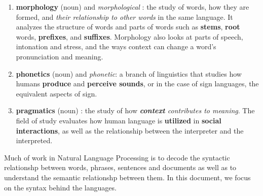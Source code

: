 \documentclass[11pt]{article}
\begin{document}
\begin{enumerate}
\item \textbf{morphology} (noun) and \emph{morphological} : the study of words, how they are formed, and \emph{their relationship to other words} in the same language. It analyzes the structure of words and parts of words such as \textbf{stems}, \textbf{root} words, \textbf{prefixes}, and \textbf{suffixes}. Morphology also looks at parts of speech, intonation and stress, and the ways context can change a word's pronunciation and meaning.
\item \textbf{phonetics} (noun)  and \emph{phonetic}: a branch of linguistics that studies how humans \textbf{produce} and \textbf{perceive sounds}, or in the case of sign languages, the equivalent aspects of sign.
\item \textbf{pragmatics} (noun) : the study of how \emph{\textbf{context} contributes to meaning}. The field of study evaluates how human language is \textbf{utilized} in \textbf{social interactions}, as well as the relationship between the interpreter and the interpreted.
\end{enumerate} 
Much of work in Natural Language Processing is to decode the syntactic relationshp between words, phrases, sentences and documents  as well as to understand the semantic relationshp between them. In this document, we focus on the syntax behind the languages. 
\end{document}
